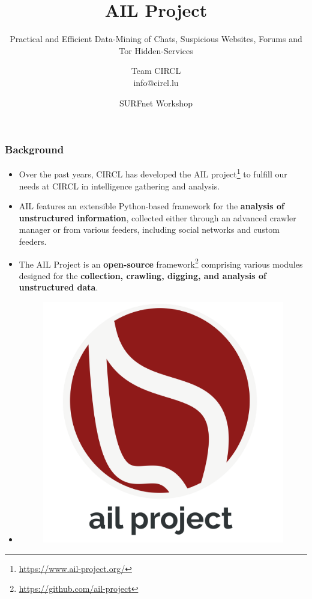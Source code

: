 \documentclass{beamer}
\author{\large{Team CIRCL}\\ \scriptsize{info@circl.lu}\\}
\title{AIL Project}
\subtitle{Practical and Efficient Data-Mining of Chats, Suspicious Websites, Forums and Tor Hidden-Services}
\institute{CIRCL}
\date{SURFnet Workshop}
\begin{document}
\begin{frame}[t,plain]
\titlepage
\end{frame}

\begin{frame}
    \frametitle{Background}
    \begin{itemize}
        \item Over the past years, CIRCL has developed the AIL project\footnote{\url{https://www.ail-project.org/}} to fulfill our needs at CIRCL in intelligence gathering and analysis.
        \item AIL features an extensible Python-based framework for the \textbf{analysis of unstructured information}, collected either through an advanced crawler manager or from various feeders, including social networks and custom feeders.
        \item The AIL Project is an \textbf{open-source} framework\footnote{\url{https://github.com/ail-project}} comprising various modules designed for the \textbf{collection, crawling, digging, and analysis of unstructured data}.
        \item 
            \begin{figure}
                \centering
                \includegraphics[scale=0.1]{images/ail-project.png}
            \end{figure}
    \end{itemize}
\end{frame}
\end{document}
